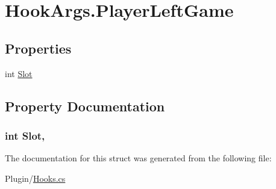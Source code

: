 \hypertarget{structOTA_1_1Plugin_1_1HookArgs_1_1PlayerLeftGame}{}\section{Hook\+Args.\+Player\+Left\+Game}
\label{structOTA_1_1Plugin_1_1HookArgs_1_1PlayerLeftGame}
\subsection*{Properties}
\begin{DoxyCompactItemize}
\item 
int \hyperlink{structOTA_1_1Plugin_1_1HookArgs_1_1PlayerLeftGame_a845a62ef01927ccc8bd45a41de3996f1}{Slot}
\end{DoxyCompactItemize}


\subsection{Property Documentation}
\hypertarget{structOTA_1_1Plugin_1_1HookArgs_1_1PlayerLeftGame_a845a62ef01927ccc8bd45a41de3996f1}{}
\subsubsection[{Slot}]{\setlength{\rightskip}{0pt plus 5cm}int Slot\hspace{0.3cm}{\ttfamily [get]}, {\ttfamily [set]}}\label{structOTA_1_1Plugin_1_1HookArgs_1_1PlayerLeftGame_a845a62ef01927ccc8bd45a41de3996f1}


The documentation for this struct was generated from the following file\+:\begin{DoxyCompactItemize}
\item 
Plugin/\hyperlink{Hooks_8cs}{Hooks.\+cs}\end{DoxyCompactItemize}
